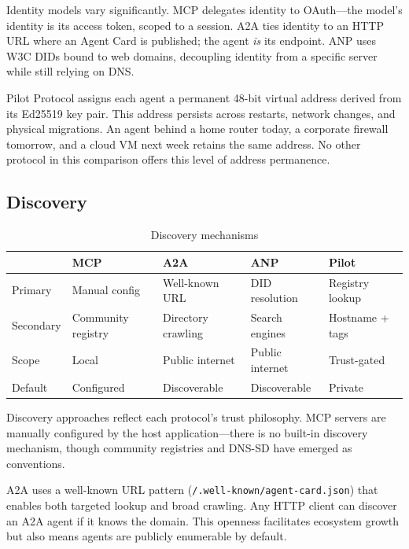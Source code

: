 \documentclass[11pt,a4paper]{article}
\begin{document}
Identity models vary significantly. MCP delegates identity to OAuth---the model's identity is its access token, scoped to a session. A2A ties identity to an HTTP URL where an Agent Card is published; the agent \textit{is} its endpoint. ANP uses W3C DIDs bound to web domains, decoupling identity from a specific server while still relying on DNS.

Pilot Protocol assigns each agent a permanent 48-bit virtual address derived from its Ed25519 key pair. This address persists across restarts, network changes, and physical migrations. An agent behind a home router today, a corporate firewall tomorrow, and a cloud VM next week retains the same address. No other protocol in this comparison offers this level of address permanence.

\subsection{Discovery}

\begin{table}[h]
\centering
\caption{Discovery mechanisms}
\label{tab:discovery}
\begin{tabular}{@{}L{1.5cm}L{2.5cm}L{2.5cm}L{2.5cm}L{3cm}@{}}
\toprule
& \textbf{MCP} & \textbf{A2A} & \textbf{ANP} & \textbf{Pilot} \\
\midrule
Primary & Manual config & Well-known URL & DID resolution & Registry lookup \\
Secondary & Community registry & Directory crawling & Search engines & Hostname + tags \\
Scope & Local & Public internet & Public internet & Trust-gated \\
Default & Configured & Discoverable & Discoverable & Private \\
\bottomrule
\end{tabular}
\end{table}

Discovery approaches reflect each protocol's trust philosophy. MCP servers are manually configured by the host application---there is no built-in discovery mechanism, though community registries and DNS-SD have emerged as conventions.

A2A uses a well-known URL pattern (\texttt{/.well-known/agent-card.json}) that enables both targeted lookup and broad crawling. Any HTTP client can discover an A2A agent if it knows the domain. This openness facilitates ecosystem growth but also means agents are publicly enumerable by default.
\end{document}
